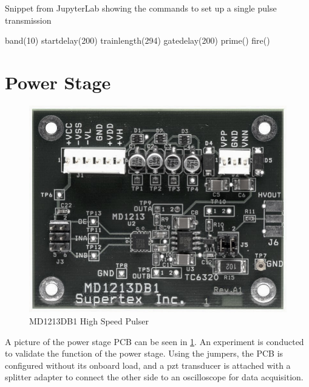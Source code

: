 \begin{listing}[htbp]
	\centering
	\caption{Snippet from JupyterLab showing the commands to set up a single pulse transmission}
	\label{lst:4_controlsystem_jupyter_cmds}
	\begin{mintedpython}
band(10)
startdelay(200)
trainlength(294)
gatedelay(200)
prime()
fire()
	\end{mintedpython}
\end{listing}

\section{Power Stage}
\begin{figure}[htbp]
	\centering
	\includegraphics[width=.8\textwidth]{Figures/4_transmitter_pcb_pic.jpg}
	\caption{MD1213DB1 High Speed Pulser}
	\label{fig:4_transmitter_pcb_pic}
\end{figure}
A picture of the power stage PCB can be seen in \cref{fig:4_transmitter_pcb_pic}. An experiment is conducted to validate the function of the power stage. Using the jumpers, the PCB is configured without its onboard load, and a \gls{pzt} transducer is attached with a splitter adapter to connect the other side to an oscilloscope for data acquisition.

